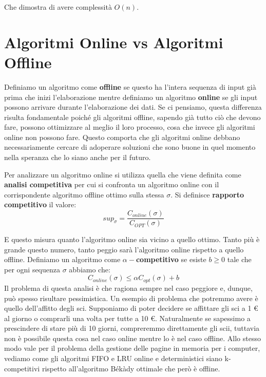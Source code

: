 Che dimostra di avere complessità $O(n)$.

\section{Algoritmi Online vs Algoritmi Offline}
Definiamo un algoritmo come \textbf{offline} se questo ha l'intera sequenza di input già prima che inizi l'elaborazione mentre definiamo un algoritmo \textbf{online} se gli input possono arrivare durante l'elaborazione dei dati. Se ci pensiamo, questa differenza risulta fondamentale poiché gli algoritmi offline, sapendo già tutto ciò che devono fare, possono ottimizzare al meglio il loro processo, cosa che invece gli algoritmi online non possono fare. Questo comporta che gli algoritmi online debbano necessariamente cercare di adoperare soluzioni che sono buone in quel momento nella speranza che lo siano anche per il futuro. 

Per analizzare un algoritmo online si utilizza quella che viene definita come \textbf{analisi competitiva} per cui si confronta un algoritmo online con il corrispondente algoritmo offline ottimo sulla stessa $\sigma$. Si definisce \textbf{rapporto competitivo} il valore:
\[sup_\sigma=\frac{C_{online}(\sigma)}{C_{OPT}(\sigma)}\]

E questo misura quanto l'algoritmo online sia vicino a quello ottimo. Tanto più è grande questo numero, tanto peggio sarà l'algoritmo online rispetto a quello offline. Definiamo un algoritmo come \textbf{$\alpha-$competitivo} se esiste $b \ge 0$ tale che per ogni sequenza $\sigma$ abbiamo che:
\[C_{online}(\sigma) \leq \alpha C_{opt}(\sigma)+b\]
Il problema di questa analisi è che ragiona sempre nel caso peggiore e, dunque, può spesso risultare pessimistica. 
Un esempio di problema che potremmo avere è quello dell'affitto degli sci. Supponiamo di poter decidere se affittare gli sci a 1 € al giorno o comprarli una volta per tutte a 10 €. Naturalmente se sapessimo a prescindere di stare più di 10 giorni, compreremmo direttamente gli scii, tuttavia non è possibile questa cosa nel caso online mentre lo è nel caso offline.
Allo stesso modo vale per il problema della gestione delle pagine in memoria per i computer, vediamo come gli algoritmi FIFO e LRU online e deterministici siano k-competitivi rispetto all'algoritmo Békàdy ottimale che però è offline.
